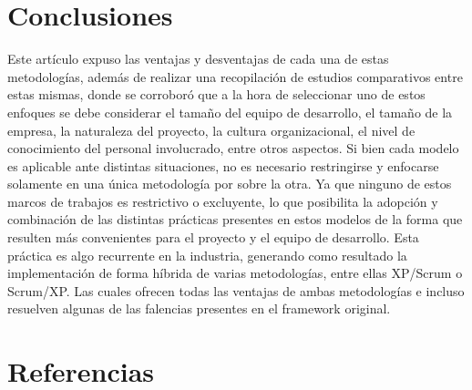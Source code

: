 \documentclass[a4paper,10pt]{article}
\begin{document}
	\section{Conclusiones}
	Este artículo expuso las ventajas y desventajas de cada una de estas metodologías, además de realizar una recopilación de estudios comparativos entre estas mismas, donde se corroboró que a la hora de seleccionar uno de estos enfoques se debe considerar el tamaño del equipo de desarrollo, el tamaño de la empresa, la naturaleza del proyecto, la cultura organizacional, el nivel de conocimiento del personal involucrado, entre otros aspectos. Si bien cada modelo es aplicable ante distintas situaciones, no es necesario restringirse y enfocarse solamente en una única metodología por sobre la otra. Ya que ninguno de estos marcos de trabajos es restrictivo o excluyente, lo que posibilita la adopción y combinación de las distintas prácticas presentes en estos modelos de la forma que resulten más convenientes para el proyecto y el equipo de desarrollo. Esta práctica es algo recurrente en la industria, generando como resultado la implementación de forma híbrida de varias metodologías, entre ellas XP/Scrum o Scrum/XP. Las cuales ofrecen todas las ventajas de ambas metodologías e incluso resuelven algunas de las falencias presentes en el framework original.
	
	\nocite{*}
	\section{Referencias}
	\printbibliography[heading=none]
\end{document}
